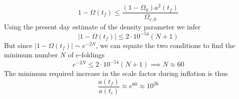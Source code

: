 \begin{equation*}
    1-\Omega(t_{f})\leq \frac{(1-\Omega_{0})a^{2}(t_{f})}{\Omega_{r,0}}
\end{equation*}
Using the present day estimate of the density parameter we infer 
\begin{equation*}
    |1-\Omega(t_{f})| \leq 2\cdot 10^{-54}(N+1)
\end{equation*}
But since $|1-\Omega(t_{f})|\sim e^{-2N}$, we can equate the two conditions to find the minimum number $N$ of $e$-foldings 
\begin{equation*}
    e^{-2N} \leq 2\cdot 10^{-54}(N+1) \implies N\approx 60
\end{equation*}
The minimum required increase in the scale factor during inflation is thus
\begin{equation*}
    \frac{a(t_{f})}{a(t_{i})} \approx e^{60} \approx 10^{26}
\end{equation*}

